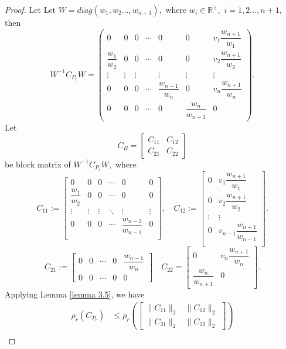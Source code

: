 \documentclass[10pt,a4paper]{amsart}
\begin{document}
\begin{proof}
	Let Let $W=diag\left({w_{1}},{w_{2}}\dots,{w_{n+1}}\right),$ where $w_{i} \in \mathbb{R}^+,$ $i=1,2\dots,n+1$, then
	\[
	W^{-1} C_{P_{r}} W = 
	\begin{pmatrix}
		0 & 0 & 0 & \cdots&0&0 & v_{1}\dfrac{w_{n+1}}{w_{1}} \\
		\dfrac{w_{1}}{w_{2}} & 0 & 0 & \cdots& 0&0 & v_{2}\dfrac{w_{n+1}}{w_{2}} \\
		\vdots & \vdots & \vdots &  & \vdots& \vdots&\vdots \\
		0 & 0 & 0 & \cdots &\dfrac{w_{n-1}}{w_{n}}&0& v_{n}\dfrac{w_{n+1}}{w_{n}} \\
		0  & 0& 0 & \cdots &0& \dfrac{w_{n}}{w_{n+1}}&0
	\end{pmatrix}
.	\]
	Let \[C_{B}=\begin{bmatrix}
		C_{11} & C_{12} \\
		C_{21} & C_{22}
	\end{bmatrix}\] be block matrix of $W^{-1}C_{P_{r}}W,$
	where \[
	C_{11} := 
	\begin{bmatrix}
		0 &0 & 0 & \cdots & 0&0\\
		\dfrac{w_{1}}{w_{2}} & 0 &0& \cdots &0&0   \\
		\vdots & \vdots & \vdots & \ddots & \vdots&\vdots \\
		0 & 0 & 0 & \cdots & \dfrac{w_{n-2}}{w_{n-1}}&0 \\
	\end{bmatrix},
	\quad C_{12} := 
	\begin{bmatrix}
		0 & v_{1}\dfrac{w_{n+1}}{w_{1}} \\
		0 & v_{2}\dfrac{w_{n+1}}{w_{2}} \\
		\vdots&\vdots \\ 
		0& v_{n-1}\dfrac{w_{n+1}}{w_{n-1}} \\
	\end{bmatrix}. \]          
	\[C_{21} := \begin{bmatrix}
		0 &0&\cdots& 0 &\dfrac{w_{n-1}}{w_{n}}\\0 &0&\cdots& 0 &0
	\end{bmatrix}\quad 
	C_{22}=\begin{bmatrix}
		0 &v_{n}\dfrac{w_{n+1}}{w_{n}}\\ \dfrac{w_{n}}{w_{n+1}}&0
	\end{bmatrix}.\]
	Applying Lemma \ref{lemma 3.5}, we have
	\begin{align*}
		\rho_{r}(C_{P_{r}}) &\leq \rho_{r}\left(\left[\begin{array}{cc} \|C_{11}\|_{2} & \|C_{12}\|_{2} \\ \|C_{21}\|_{2} & \|C_{22}\|_{2} \end{array}\right]\right) \\

\end{align*}
\end{proof}
\end{document}
